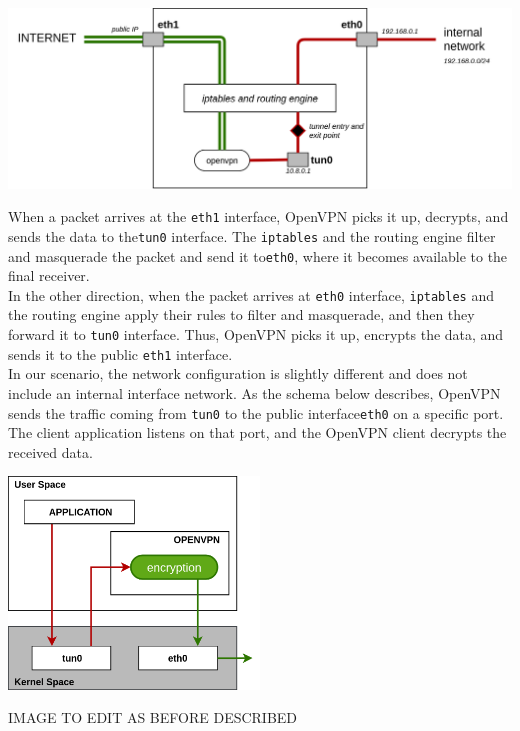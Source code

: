 \documentclass[12pt]{article}
\begin{document}
	\bigbreak
	\begin{center}
		\includegraphics[width=1\textwidth]{images/openvpn_routing_setup.png}
	\end{center}
	\bigbreak
	When a packet arrives at the \lstinline{eth1} interface, OpenVPN picks it up, decrypts, and sends the data to the\lstinline{tun0} interface. The \lstinline{iptables} and the routing engine filter and masquerade the packet and send it to\lstinline{eth0}, where it becomes available to the final receiver.\\
	In the other direction, when the packet arrives at \lstinline{eth0} interface, \lstinline{iptables} and the routing engine apply their rules to filter and masquerade, and then they forward it to \lstinline{tun0} interface. Thus, OpenVPN picks it up, encrypts the data, and sends it to the public \lstinline{eth1} interface.\\
	In our scenario, the network configuration is slightly different and does not include an internal interface network. As the schema below describes, OpenVPN sends the traffic coming from \lstinline{tun0} to the public interface\lstinline{eth0} on a specific port. The client application listens on that port, and the OpenVPN client decrypts the received data.\\
	\bigbreak

	\begin{center}
		\includegraphics[width=0.5\textwidth]{images/openvpn_tun_interface.png}
	\end{center}
	IMAGE TO EDIT AS BEFORE DESCRIBED\\
\end{document}
